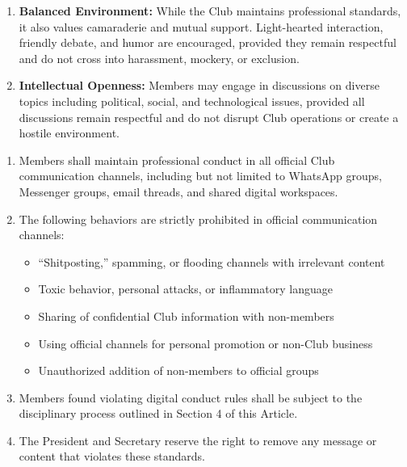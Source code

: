 \begin{enumerate}[label=\alph*), leftmargin=2em, itemsep=0.3em]
    \item \textbf{Balanced Environment:} While the Club maintains professional standards, it also values camaraderie and mutual support. Light-hearted interaction, friendly debate, and humor are encouraged, provided they remain respectful and do not cross into harassment, mockery, or exclusion.
    
    \item \textbf{Intellectual Openness:} Members may engage in discussions on diverse topics including political, social, and technological issues, provided all discussions remain respectful and do not disrupt Club operations or create a hostile environment.
\end{enumerate}


\begin{enumerate}[label=\alph*), leftmargin=2em, itemsep=0.3em]
    \item Members shall maintain professional conduct in all official Club communication channels, including but not limited to WhatsApp groups, Messenger groups, email threads, and shared digital workspaces.
    
    \item The following behaviors are strictly prohibited in official communication channels:
    \begin{itemize}[leftmargin=1.5em, itemsep=0.2em]
        \item ``Shitposting,'' spamming, or flooding channels with irrelevant content
        \item Toxic behavior, personal attacks, or inflammatory language
        \item Sharing of confidential Club information with non-members
        \item Using official channels for personal promotion or non-Club business
        \item Unauthorized addition of non-members to official groups
    \end{itemize}
    
    \item Members found violating digital conduct rules shall be subject to the disciplinary process outlined in Section 4 of this Article.
    
    \item The President and Secretary reserve the right to remove any message or content that violates these standards.
\end{enumerate}

